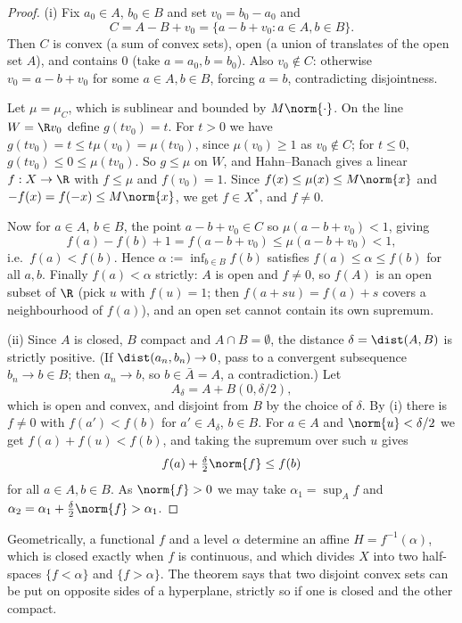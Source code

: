 \begin{proof}
	(i) Fix $a_0 \in A$, $b_0 \in B$ and set $v_0 = b_0 - a_0$ and
	$$C = A - B + v_0 = \{a - b + v_0 : a \in A, b \in B\}.$$
	Then $C$ is convex (a sum of convex sets), open (a union of translates of the open set $A$), and contains $0$ (take $a = a_0, b = b_0$). Also $v_0 \notin C$: otherwise $v_0 = a - b + v_0$ for some $a \in A, b\in B$, forcing $a = b$, contradicting disjointness.

	Let $\mu = \mu_C$, which is sublinear and bounded by $M\norm{\cdot}$. On the line $W = \R v_0$ define $g(t v_0) = t$. For $t > 0$ we have $g(tv_0) = t \leq t\mu(v_0) = \mu(tv_0)$, since $\mu(v_0) \geq 1$ as $v_0 \notin C$; for $t \leq 0$, $g(tv_0) \leq 0 \leq \mu(tv_0)$. So $g \leq \mu$ on $W$, and Hahn--Banach gives a linear $f : X \to \R$ with $f \leq \mu$ and $f(v_0) = 1$. Since $f(x) \leq \mu(x) \leq M\norm{x}$ and $-f(x) = f(-x) \leq M\norm{x}$, we get $f \in X^*$, and $f \neq 0$.

	Now for $a \in A$, $b \in B$, the point $a - b + v_0 \in C$ so $\mu(a - b + v_0) < 1$, giving
	$$f(a) - f(b) + 1 = f(a - b + v_0) \leq \mu(a-b+v_0) < 1,$$
	i.e.\ $f(a) < f(b)$. Hence $\alpha := \inf_{b \in B} f(b)$ satisfies $f(a) \leq \alpha \leq f(b)$ for all $a, b$. Finally $f(a) < \alpha$ strictly: $A$ is open and $f \neq 0$, so $f(A)$ is an open subset of $\R$ (pick $u$ with $f(u) = 1$; then $f(a + su) = f(a) + s$ covers a neighbourhood of $f(a)$), and an open set cannot contain its own supremum.

	(ii) Since $A$ is closed, $B$ compact and $A \cap B = \emptyset$, the distance $\delta = \dist(A,B)$ is strictly positive. (If $\dist(a_n,b_n) \to 0$, pass to a convergent subsequence $b_n \to b \in B$; then $a_n \to b$, so $b \in \bar A = A$, a contradiction.) Let
	$$A_\delta = A + B(0, \delta/2),$$
	which is open and convex, and disjoint from $B$ by the choice of $\delta$. By (i) there is $f \neq 0$ with $f(a') < f(b)$ for $a' \in A_\delta$, $b \in B$. For $a \in A$ and $\norm{u} < \delta/2$ we get $f(a) + f(u) < f(b)$, and taking the supremum over such $u$ gives
	$$f(a) + \tfrac{\delta}{2}\norm{f} \leq f(b)$$
	for all $a \in A, b \in B$. As $\norm{f} > 0$ we may take $\alpha_1 = \sup_A f$ and $\alpha_2 = \alpha_1 + \frac{\delta}{2}\norm{f} > \alpha_1$.
\end{proof}

Geometrically, a functional $f$ and a level $\alpha$ determine an affine  $H = f^{-1}(\alpha)$, which is closed exactly when $f$ is continuous, and which divides $X$ into two half-spaces $\{f < \alpha\}$ and $\{f > \alpha\}$. The theorem says that two disjoint convex sets can be put on opposite sides of a hyperplane, strictly so if one is closed and the other compact.

